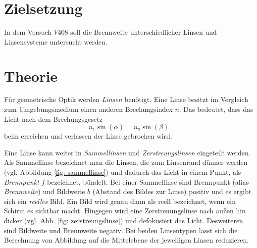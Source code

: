 \setcounter{page}{1}
\section*{Zielsetzung}
In dem Versuch $V408$ soll die Brennweite unterschiedlicher Linsen und
Linsensysteme untersucht werden.
\section{Theorie}
Für geometrische Optik werden \emph{Linsen} benötigt. %
Eine Linse besitzt im Vergleich zum Umgebungsmedium einen anderen Brechungsindex $n$.
Das bedeutet, dass das Licht nach dem Brechungsgesetz
\begin{equation*}
  n_1\sin(\alpha)=n_2\sin(\beta)
\end{equation*}
beim erreichen und verlassen der Linse gebrochen wird. %

Eine Linse kann weiter in \emph{Sammellinsen} und \emph{Zerstreungslinsen} %
eingeteilt werden. Als Sammellinse bezeichnet man die Linsen, die zum Linsenrand %
dünner werden (vgl. Abbildung \ref{fig: sammellinse}) und dadurch das Licht in einem Punkt, als \emph{Brennpunkt} $f$ bezeichnet,
bündelt.
Bei einer Sammellinse sind Brennpunkt (alias \emph{Brennweite}) %
und Bildweite $b$ (Abstand des Bildes zur Linse) positiv und es ergibt sich ein
\emph{reelles} Bild. Ein Bild wird genau dann als reell bezeichnet, wenn
ein Schirm es sichtbar macht.
Hingegen wird eine Zerstreuungslinse nach außen hin dicker (vgl. Abb. \ref{fig: zerstreungslinse}) und
defokusiert das Licht. Desweiteren sind Bildweite und Brennweite negativ.
Bei beiden Linsentypen lässt sich die Berechnung von Abbildung auf die Mittelebene %
der jeweiligen Linsen reduzieren.


